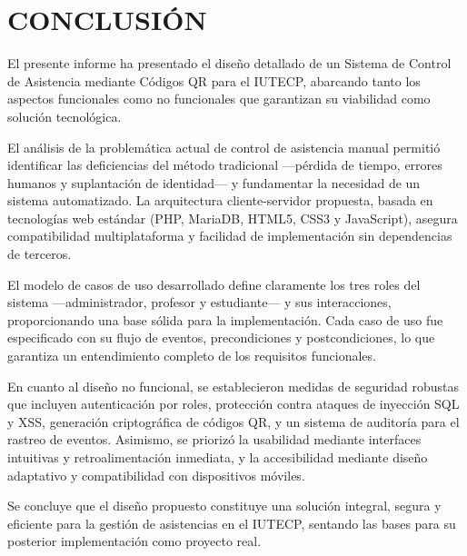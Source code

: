 \documentclass[12pt, letterpaper, oneside]{report}
\begin{document}
\chapter*{CONCLUSI\'ON}

El presente informe ha presentado el dise\~no detallado de un Sistema de Control de Asistencia mediante C\'odigos QR para el IUTECP, abarcando tanto los aspectos funcionales como no funcionales que garantizan su viabilidad como soluci\'on tecnol\'ogica.

El an\'alisis de la problem\'atica actual de control de asistencia manual permiti\'o identificar las deficiencias del m\'etodo tradicional ---p\'erdida de tiempo, errores humanos y suplantaci\'on de identidad--- y fundamentar la necesidad de un sistema automatizado. La arquitectura cliente-servidor propuesta, basada en tecnolog\'ias web est\'andar (PHP, MariaDB, HTML5, CSS3 y JavaScript), asegura compatibilidad multiplataforma y facilidad de implementaci\'on sin dependencias de terceros.

El modelo de casos de uso desarrollado define claramente los tres roles del sistema ---administrador, profesor y estudiante--- y sus interacciones, proporcionando una base s\'olida para la implementaci\'on. Cada caso de uso fue especificado con su flujo de eventos, precondiciones y postcondiciones, lo que garantiza un entendimiento completo de los requisitos funcionales.

En cuanto al dise\~no no funcional, se establecieron medidas de seguridad robustas que incluyen autenticaci\'on por roles, protecci\'on contra ataques de inyecci\'on SQL y XSS, generaci\'on criptogr\'afica de c\'odigos QR, y un sistema de auditor\'ia para el rastreo de eventos. Asimismo, se prioriz\'o la usabilidad mediante interfaces intuitivas y retroalimentaci\'on inmediata, y la accesibilidad mediante dise\~no adaptativo y compatibilidad con dispositivos m\'oviles.

Se concluye que el dise\~no propuesto constituye una soluci\'on integral, segura y eficiente para la gesti\'on de asistencias en el IUTECP, sentando las bases para su posterior implementaci\'on como proyecto real.
\end{document}
